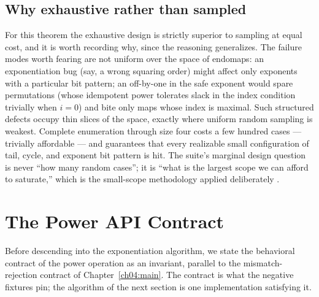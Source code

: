 \subsection{Why exhaustive rather than sampled}

For this theorem the exhaustive design is strictly superior to sampling at
equal cost, and it is worth recording why, since the reasoning generalizes.
The failure modes worth fearing are not uniform over the space of endomaps:
an exponentiation bug (say, a wrong squaring order) might affect only
exponents with a particular bit pattern; an off-by-one in the safe exponent
would spare permutations (whose idempotent power tolerates slack in the
index condition trivially when $i=0$) and bite only maps whose index is
maximal. Such structured defects occupy thin slices of the space, exactly
where uniform random sampling is weakest. Complete enumeration through size
four costs a few hundred cases --- trivially affordable --- and guarantees
that every realizable small configuration of tail, cycle, and exponent bit
pattern is hit. The suite's marginal design question is never ``how many
random cases''; it is ``what is the largest scope we can afford to
saturate,'' which is the small-scope methodology applied deliberately
\cite{jackson}.

\section{The Power API Contract}
\label{ch05:sec:apicontract}

Before descending into the exponentiation algorithm, we state the
behavioral contract of the power operation as an invariant, parallel to
the mismatch-rejection contract of Chapter~\ref{ch04:main}. The contract
is what the negative fixtures pin; the algorithm of the next section is
one implementation satisfying it.

